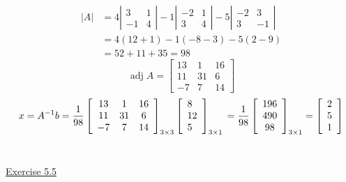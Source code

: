 \begin{enumerate}
\[
\begin{aligned}
|A| &=4\left|\begin{array}{cc}
3 & 1 \\
-1 & 4
\end{array}\right|-1\left|\begin{array}{cc}
-2 & 1 \\
3 & 4
\end{array}\right|-5\left|\begin{array}{cc}
-2 & 3 \\
3 & -1
\end{array}\right| \\
&=4(12+1)-1(-8-3)-5(2-9) \\
&=52+11+35=98
\end{aligned}
\]
\[
\operatorname{adj} A =\left[\begin{array}{ccc}
13 & 1 & 16 \\
11 & 31 & 6 \\
-7 & 7 & 14
\end{array}\right] \]
\[
x=A^{-1} b =\frac{1}{98}\left[\begin{array}{ccc}
13 & 1 & 16 \\
11 & 31 & 6 \\
-7 & 7 & 14
\end{array}\right]_{3 \times 3} \left[\begin{array}{l}
8 \\
12 \\
5
\end{array}\right]_{3 \times 1} \\
=\frac{1}{98}\left[\begin{array}{c}
196 \\
490 \\
98
\end{array}\right]_{3 \times 1}=\left[\begin{array}{c}
2 \\
5 \\
1
\end{array}\right]
\] \\
\end{enumerate}

\underline{Exercise 5.5} 

